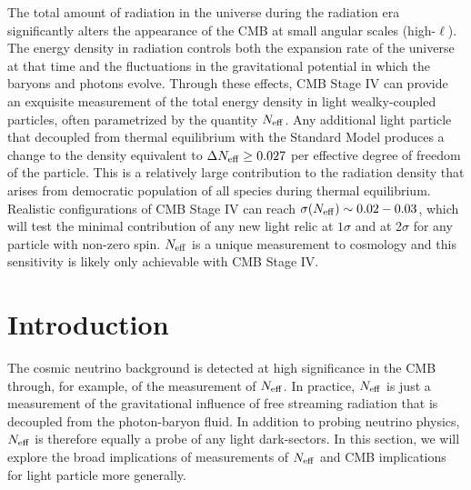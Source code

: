 The total amount of radiation in the universe during the radiation era significantly alters the appearance of the CMB at small angular scales (high-$\ell$).  The energy density in radiation controls both the expansion rate of the universe at that time and the fluctuations in the gravitational potential in which the baryons and photons evolve.  Through these effects, CMB Stage IV can provide an exquisite measurement of the total energy density in light wealky-coupled particles, often parametrized by the quantity $N_{\rm eff}$.  Any additional light particle that decoupled from thermal equilibrium with the Standard Model produces a change to the density equivalent to $\Delta N_{\rm eff} \geq 0.027$ per effective degree of freedom of the particle.  This is a relatively large contribution to the radiation density that arises from democratic population of all species during thermal equilibrium.  Realistic configurations of CMB Stage IV can reach $\sigma(N_{\rm eff}) \sim 0.02-0.03$, which will test the minimal contribution of any new light relic at $1\sigma$ and at 2$\sigma$ for any particle with non-zero spin.  $N_{\rm eff}$ is a unique measurement to cosmology and this sensitivity is likely only achievable with CMB Stage IV.  

\section{Introduction}



The cosmic neutrino background is detected at high significance in the CMB through, for example, of the measurement of $N_{\rm eff}$.  In practice, $N_{\rm eff}$ is just a measurement of the gravitational influence of free streaming radiation that is decoupled from the photon-baryon fluid.  In addition to probing neutrino physics, $N_{\rm eff}$ is therefore equally a probe of any light dark-sectors.  In this section, we will explore the broad implications of measurements of $N_{\rm eff}$ and CMB implications for light particle more generally.

